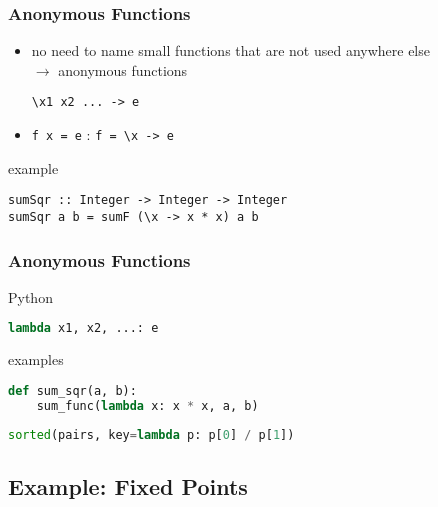 \documentclass[dvipsnames]{beamer}
\theoremstyle{plain}
\begin{document}
\begin{frame}[fragile]
  \frametitle{Anonymous Functions}

  \begin{itemize}
    \item no need to name small functions that are not used anywhere else\\
      $\rightarrow$ \alert{anonymous} functions
    \begin{lstlisting}[style=syntax]
\x1 x2 ... -> e
    \end{lstlisting}
    \item \lstinline|f x = e| \hspace{36pt} : \hspace{36pt} \lstinline|f = \x -> e|
  \end{itemize}

  \pause
  \medskip
  \begin{exampleblock}{example}
    \begin{lstlisting}
sumSqr :: Integer -> Integer -> Integer
sumSqr a b = sumF (\x -> x * x) a b
    \end{lstlisting}
  \end{exampleblock}
\end{frame}

\begin{frame}[fragile]
  \frametitle{Anonymous Functions}

  \begin{block}{Python}
    \begin{lstlisting}[language=Python, style=syntax]
lambda x1, x2, ...: e
    \end{lstlisting}
  \end{block}

  \medskip
  \begin{exampleblock}{examples}
    \begin{lstlisting}[language=Python]
def sum_sqr(a, b):
    sum_func(lambda x: x * x, a, b)
    \end{lstlisting}

    \pause
    \bigskip
    \begin{lstlisting}[language=Python]
sorted(pairs, key=lambda p: p[0] / p[1])
    \end{lstlisting}
  \end{exampleblock}
\end{frame}

\subsection{Example: Fixed Points}
\end{document}
